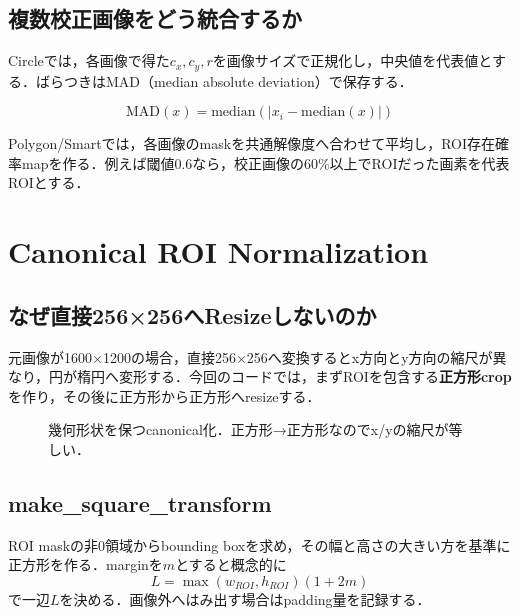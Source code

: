 \documentclass[a4paper,11pt]{ltjsreport}
\begin{document}
\section{複数校正画像をどう統合するか}
Circleでは，各画像で得た\(c_x,c_y,r\)を画像サイズで正規化し，中央値を代表値とする．ばらつきはMAD（median absolute deviation）で保存する．

\[
\mathrm{MAD}(x)=\mathrm{median}(|x_i-\mathrm{median}(x)|)
\]

Polygon/Smartでは，各画像のmaskを共通解像度へ合わせて平均し，ROI存在確率mapを作る．例えば閾値0.6なら，校正画像の60\%以上でROIだった画素を代表ROIとする．

\chapter{Canonical ROI Normalization}

\section{なぜ直接256×256へResizeしないのか}
元画像が1600×1200の場合，直接256×256へ変換するとx方向とy方向の縮尺が異なり，円が楕円へ変形する．今回のコードでは，まずROIを包含する\textbf{正方形crop}を作り，その後に正方形から正方形へresizeする．

\begin{figure}[H]
\centering
{}
\caption{幾何形状を保つcanonical化．正方形→正方形なのでx/yの縮尺が等しい．}
\end{figure}

\section{make\_square\_transform}
ROI maskの非0領域からbounding boxを求め，その幅と高さの大きい方を基準に正方形を作る．marginを\(m\)とすると概念的に
\[
L=\max(w_{ROI},h_{ROI})(1+2m)
\]
で一辺\(L\)を決める．画像外へはみ出す場合はpadding量を記録する．
\end{document}
